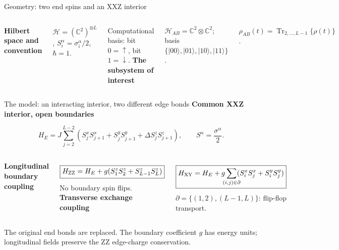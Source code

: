 \documentclass[aspectratio=169,10pt]{beamer}
\newcommand{\Tr}{\operatorname{Tr}}
\newcommand{\ket}[1]{\lvert #1\rangle}
\newcommand{\rhoAB}{\rho_{AB}}
\newcommand{\sechead}[1]{{\color{sea}\bfseries #1}\par\vspace{1mm}}
\newcommand{\noteinline}[1]{{\color{muted}\footnotesize #1}}
\begin{document}
\begin{frame}{Geometry: two end spins and an XXZ interior}
  \begin{center}
  \end{center}
  \vspace{.20cm}
  \begin{columns}[T,onlytextwidth]
      \sechead{Hilbert space and convention}
      $\mathcal H=(\mathbb C^2)^{\otimes L}$, \quad $S_i^\alpha=\sigma_i^\alpha/2$, \quad $\hbar=1$.
      \par Computational basis: bit $0=\uparrow$, bit $1=\downarrow$.
      \sechead{The subsystem of interest}
      $\mathcal H_{AB}=\mathbb C^2\otimes\mathbb C^2$; basis $\{\ket{00},\ket{01},\ket{10},\ket{11}\}$.
      \par $\rhoAB(t)=\Tr_{2,\ldots,L-1}\{\rho(t)\}$.
  \end{columns}
\end{frame}

\begin{frame}{The model: an interacting interior, two different edge bonds}
\sechead{Common XXZ interior, open boundaries}
\[
H_E=J\sum_{j=2}^{L-2}\!\left(S_j^x S_{j+1}^x+S_j^yS_{j+1}^y+\Delta S_j^zS_{j+1}^z\right),
\qquad S^\alpha=\frac{\sigma^\alpha}{2}.
\]
\vspace{.04cm}
\begin{columns}[T,onlytextwidth]
\sechead{Longitudinal boundary coupling}
\[
\boxed{H_{\rm ZZ}=H_E+g(S_1^zS_2^z+S_{L-1}^zS_L^z)}
\]
\smallskip
No boundary spin flips.
\sechead{Transverse exchange coupling}
\[
\boxed{H_{\rm XY}=H_E+g\!\!\!\sum_{(i,j)\in\partial}\!\!\!(S_i^xS_j^x+S_i^yS_j^y)}
\]
\smallskip
\(\partial=\{(1,2),(L-1,L)\}\): flip-flop transport.
\end{columns}
\smallskip
\par\vspace{.10cm}
\noteinline{The original end bonds are replaced. The boundary coefficient \(g\) has energy units; longitudinal fields preserve the ZZ edge-charge conservation.}
\end{frame}
\end{document}
